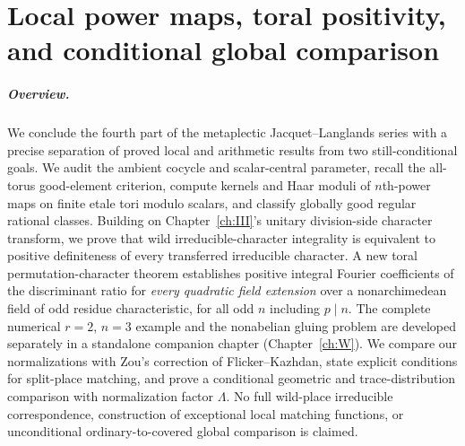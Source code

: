 \begingroup
\providecommand{\F}{}\renewcommand{\F}{F}
\providecommand{\K}{}\renewcommand{\K}{K}
\providecommand{\A}{}\renewcommand{\A}{\mathbb A}
\providecommand{\C}{}\renewcommand{\C}{\mathbb C}
\providecommand{\Z}{}\renewcommand{\Z}{\mathbb Z}
\providecommand{\GL}{}\renewcommand{\GL}{\operatorname{GL}}
\providecommand{\Irr}{}\renewcommand{\Irr}{\operatorname{Irr}}
\providecommand{\Nrd}{}\renewcommand{\Nrd}{\operatorname{Nrd}}
\providecommand{\Nm}{}\renewcommand{\Nm}{\operatorname{N}}
\providecommand{\vol}{}\renewcommand{\vol}{\operatorname{vol}}
\providecommand{\Gal}{}\renewcommand{\Gal}{\operatorname{Gal}}
\providecommand{\Aut}{}\renewcommand{\Aut}{\operatorname{Aut}}
\providecommand{\reg}{}\renewcommand{\reg}{\mathrm{reg}}
\providecommand{\tH}{}\renewcommand{\tH}{\widetilde H}
\providecommand{\tZ}{}\renewcommand{\tZ}{\widetilde Z}
\providecommand{\tT}{}\renewcommand{\tT}{\widetilde T}
\providecommand{\Gb}{}\renewcommand{\Gb}{\overline G}
\providecommand{\GDb}{}\renewcommand{\GDb}{\overline{G_D}}
\providecommand{\Ptag}{}\renewcommand{\Ptag}{\textnormal{\textbf{(P)}}}
\providecommand{\Etag}{}\renewcommand{\Etag}{\textnormal{\textbf{(E)}}}
\providecommand{\Ctag}{}\renewcommand{\Ctag}{\textnormal{\textbf{(C)}}}
\providecommand{\Otag}{}\renewcommand{\Otag}{\textnormal{\textbf{(O)}}}
\chapter[Local power maps and toral positivity]{Local power maps, toral positivity, and conditional global comparison}\label{ch:IV}
\paragraph{Overview.} We conclude the fourth part of the metaplectic Jacquet--Langlands
series with a precise separation of proved local and arithmetic
results from two still-conditional goals.  We audit the ambient
cocycle and scalar-central parameter, recall the all-torus
good-element criterion, compute kernels and Haar moduli of
$n$th-power maps on finite etale tori modulo scalars, and
classify globally good regular rational classes.  Building on
Chapter~\ref{ch:III}'s unitary division-side character transform, we prove
that wild irreducible-character integrality is equivalent to
positive definiteness of every transferred irreducible character.
A new toral permutation-character theorem establishes positive
integral Fourier coefficients of the discriminant ratio for
\emph{every quadratic field extension} over a nonarchimedean
field of odd residue characteristic, for all odd $n$ including
$p\mid n$.  The complete numerical $r=2$, $n=3$ example and the
nonabelian gluing problem are developed separately in a
standalone companion chapter (Chapter~\ref{ch:W}).  We compare
our normalizations with Zou's correction of Flicker--Kazhdan,
state explicit conditions for split-place matching, and prove
a conditional geometric and trace-distribution comparison with
normalization factor $\Lambda$.  No full wild-place irreducible
correspondence, construction of exceptional local matching
functions, or unconditional ordinary-to-covered global
comparison is claimed.

